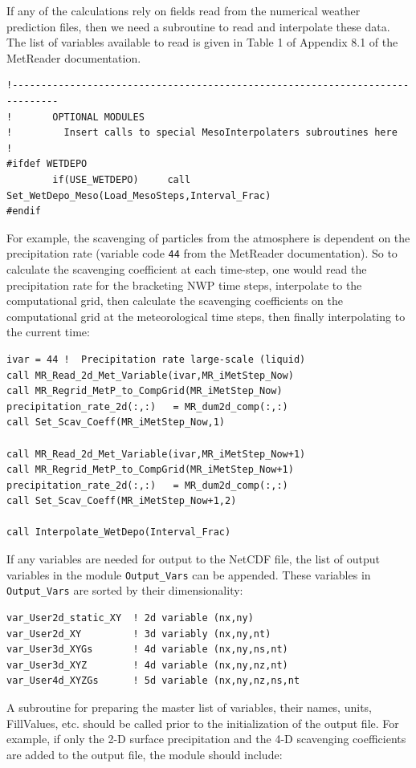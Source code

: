 If any of the calculations rely on fields read from the numerical weather
prediction files, then we need a subroutine to read and interpolate these
data.  The list of variables available to read is given in Table 1 of Appendix 8.1
of the MetReader documentation.
\small
\begin{verbatim}
!------------------------------------------------------------------------------
!       OPTIONAL MODULES
!         Insert calls to special MesoInterpolaters subroutines here
!
#ifdef WETDEPO
        if(USE_WETDEPO)     call Set_WetDepo_Meso(Load_MesoSteps,Interval_Frac)
#endif
\end{verbatim}
\normalsize
For example, the scavenging of particles from the atmosphere is dependent on
the precipitation rate (variable code \texttt{44} from the MetReader documentation).
So to calculate the scavenging coefficient at each time-step, one would read the
precipitation rate for the bracketing NWP time steps, interpolate to the computational
grid, then calculate the scavenging coefficients on the computational grid at the
meteorological time steps, then finally interpolating to the current time:
\small
\begin{verbatim}
ivar = 44 !  Precipitation rate large-scale (liquid)
call MR_Read_2d_Met_Variable(ivar,MR_iMetStep_Now)
call MR_Regrid_MetP_to_CompGrid(MR_iMetStep_Now)
precipitation_rate_2d(:,:)   = MR_dum2d_comp(:,:)
call Set_Scav_Coeff(MR_iMetStep_Now,1)

call MR_Read_2d_Met_Variable(ivar,MR_iMetStep_Now+1)
call MR_Regrid_MetP_to_CompGrid(MR_iMetStep_Now+1)
precipitation_rate_2d(:,:)   = MR_dum2d_comp(:,:)
call Set_Scav_Coeff(MR_iMetStep_Now+1,2)

call Interpolate_WetDepo(Interval_Frac)
\end{verbatim}
\normalsize
If any variables are needed for output to the NetCDF file, the list of output
variables in the module \texttt{Output\_Vars} can be appended.  These variables
in \texttt{Output\_Vars} are sorted by their dimensionality:
\small
\begin{verbatim}
var_User2d_static_XY  ! 2d variable (nx,ny)
var_User2d_XY         ! 3d variably (nx,ny,nt)
var_User3d_XYGs       ! 4d variable (nx,ny,ns,nt)
var_User3d_XYZ        ! 4d variable (nx,ny,nz,nt)
var_User4d_XYZGs      ! 5d variable (nx,ny,nz,ns,nt
\end{verbatim}
\normalsize
A subroutine for preparing the master list of variables, their names, units,
FillValues, etc. should be called prior to the initialization of the output file.
For example, if only the 2-D surface precipitation and the 4-D scavenging coefficients
are added to the output file, the module should include:

